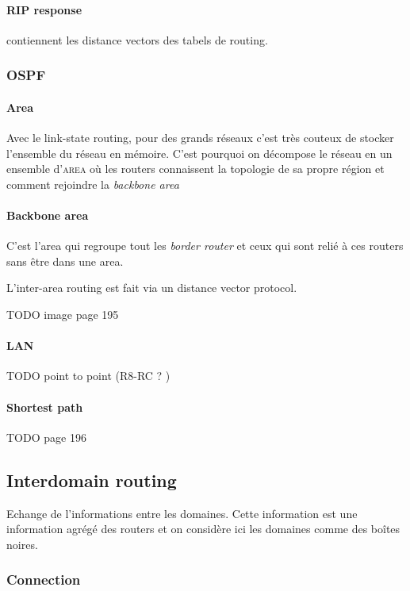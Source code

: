 \paragraph{RIP response} contiennent les distance vectors des tabels de routing.

\subsubsection{OSPF}

\paragraph{Area}
Avec le link-state routing, pour des grands réseaux c'est très couteux de stocker
l'ensemble du réseau en mémoire. C'est pourquoi on décompose le réseau en un
ensemble d'\textsc{area} où les routers connaissent la topologie de sa propre
région et comment rejoindre la \textit{backbone area}

\paragraph{Backbone area}
C'est l'area qui regroupe tout les \textit{border router} et ceux qui sont relié
à ces routers sans être dans une area.

L'inter-area routing est fait via un distance vector protocol.

TODO image page 195

\paragraph{LAN}
TODO point to point (R8-RC ? )

\paragraph{Shortest path}
TODO page 196

\subsection{Interdomain routing}
Echange de l'informations entre les domaines. Cette information est une information
agrégé des routers et on considère ici les domaines comme des boîtes noires.

\subsubsection{Connection}

